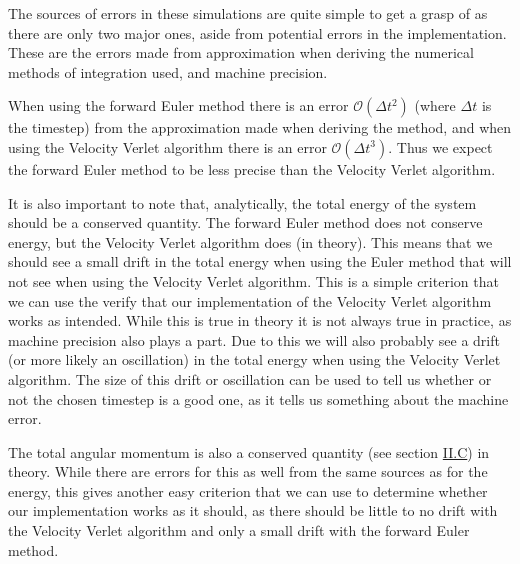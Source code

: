 \documentclass[reprint,english,notitlepage]{revtex4-1}  %
\begin{document}
The sources of errors in these simulations are quite simple to get a grasp of as there are only two major ones, aside from potential errors in the implementation. These are the errors made from approximation when deriving the numerical methods of integration used, and machine precision. 

When using the forward Euler method there is an error $\mathcal{O}(\Delta t^2)$ (where $\Delta t$ is the timestep) from the approximation made when deriving the method, and when using the Velocity Verlet algorithm there is an error $\mathcal{O}(\Delta t^3)$. Thus we expect the forward Euler method to be less precise than the Velocity Verlet algorithm. 

It is also important to note that, analytically, the total energy of the system should be a conserved quantity. The forward Euler method does not conserve energy, but the Velocity Verlet algorithm does (in theory). This means that we should see a small drift in the total energy when using the Euler method that will not see when using the Velocity Verlet algorithm. This is a simple criterion that we can use the verify that our implementation of the Velocity Verlet algorithm works as intended. While this is true in theory it is not always true in practice, as machine precision also plays a part. Due to this we will also probably see a drift (or more likely an oscillation) in the total energy when using the Velocity Verlet algorithm. The size of this drift or oscillation can be used to tell us whether or not the chosen timestep is a good one, as it tells us something about the machine error. 

The total angular momentum is also a conserved quantity (see section \hyperref[sec:II:c]{II.C}) in theory. While there are errors for this as well from the same sources as for the energy, this gives another easy criterion that we can use to determine whether our implementation works as it should, as there should be little to no drift with the Velocity Verlet algorithm and only a small drift with the forward Euler method.  
\end{document}
